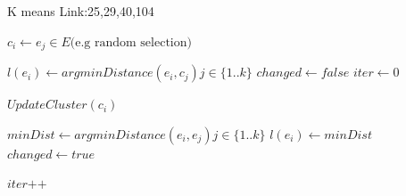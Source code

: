 \documentclass[a4paper]{article}
\begin{document}
\begin{algorithm}
 \caption{K means Link:25,29,40,104   }
    \begin{algorithmic}[1]
     
   
  \State $c_{i} \leftarrow e_{j} \in E \text{(e.g random selection)}$
   
    \EndFor
    
    \State $l(e_{i}) \leftarrow argminDistance(e_{i},c_{j})j \in \{1..k\} $
      \EndFor
      \State $changed \leftarrow false$
      \State $iter \leftarrow 0$
    
    
    \State $UpdateCluster(c_{i})$
    
     \EndFor
     
     \State $minDist \leftarrow argminDistance(e_{i},e_{j}) j \in \{1..k\}$
       \State $l(e_i) \leftarrow minDist$
       \State $changed \leftarrow true$
       
       \EndIf
     
    \EndFor
   \State $ iter \texttt{+} \texttt{+}$
      \EndWhile
   

 
 \end{algorithmic}
\end{algorithm}
\end{document}
